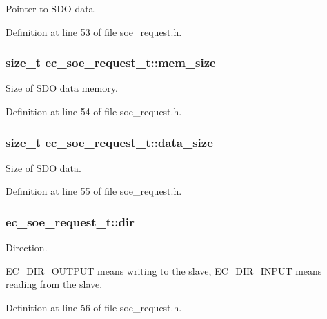 Pointer to S\-D\-O data. 



Definition at line 53 of file soe\-\_\-request.\-h.

\subsubsection[{mem\-\_\-size}]{\setlength{\rightskip}{0pt plus 5cm}size\-\_\-t ec\-\_\-soe\-\_\-request\-\_\-t\-::mem\-\_\-size}\label{structec__soe__request__t_af259cf93b71c67824d7ca728b27a5776}


Size of S\-D\-O data memory. 



Definition at line 54 of file soe\-\_\-request.\-h.

\subsubsection[{data\-\_\-size}]{\setlength{\rightskip}{0pt plus 5cm}size\-\_\-t ec\-\_\-soe\-\_\-request\-\_\-t\-::data\-\_\-size}\label{structec__soe__request__t_afb47843a1a15d493b35615bc5a65ca18}


Size of S\-D\-O data. 



Definition at line 55 of file soe\-\_\-request.\-h.

\subsubsection[{dir}]{ ec\-\_\-soe\-\_\-request\-\_\-t\-::dir}\label{structec__soe__request__t_ad9788973a47b9b82bac17e527eb6d7a6}


Direction. 

E\-C\-\_\-\-D\-I\-R\-\_\-\-O\-U\-T\-P\-U\-T means writing to the slave, E\-C\-\_\-\-D\-I\-R\-\_\-\-I\-N\-P\-U\-T means reading from the slave. 

Definition at line 56 of file soe\-\_\-request.\-h.

